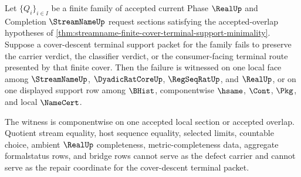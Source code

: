 \begin{theorem}
\label{thm:streamname-finite-cover-terminal-support-defect-localization}
Let $\{Q_i\}_{i \in I}$ be a finite family of accepted current Phase
$\RealUp$ and Completion $\StreamNameUp$ request sections satisfying the
accepted-overlap hypotheses of
\autoref{thm:streamname-finite-cover-terminal-support-minimality}. Suppose a
cover-descent terminal support packet for the family fails to preserve the
carrier verdict, the classifier verdict, or the consumer-facing terminal route
presented by that finite cover. Then the failure is witnessed on one local
face among $\StreamNameUp$, $\DyadicRatCoreUp$, $\RegSeqRatUp$, and
$\RealUp$, or on one displayed support row among $\BHist$, componentwise
$\hsame$, $\Cont$, $\Pkg$, and local $\NameCert$.

The witness is componentwise on one accepted local section or accepted
overlap. Quotient stream equality, host sequence equality, selected limits,
countable choice, ambient $\RealUp$ completeness, metric-completeness data,
aggregate formalstatus rows, and bridge rows cannot serve as the defect
carrier and cannot serve as the repair coordinate for the cover-descent
terminal packet.
\end{theorem}
